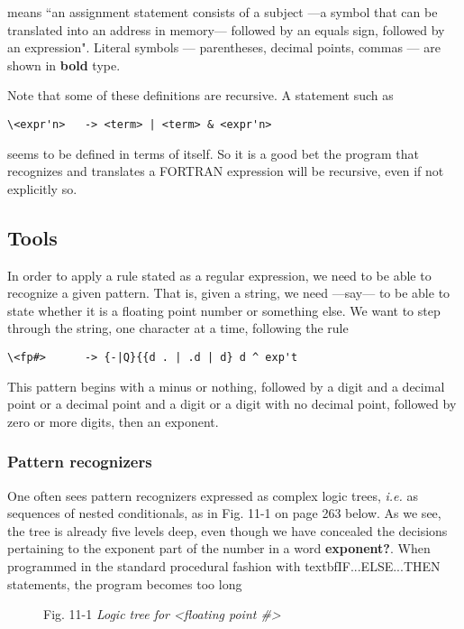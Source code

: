 \documentclass{book}
\begin{document}
means “an assignment statement consists of a subject ---a symbol that can be translated into an address in memory--- followed by an equals sign, followed by an expression". Literal symbols --- parentheses, decimal points, commas --- are shown in \textbf{bold} type.

Note that some of these definitions are recursive. A statement such as

\begin{lstlisting}
\<expr'n>   -> <term> | <term> & <expr'n>
\end{lstlisting}

seems to be defined in terms of itself. So it is a good bet the program that recognizes and translates a FORTRAN expression will be recursive, even if not explicitly so.

\subsection{Tools}

In order to apply a rule stated as a regular expression, we need to be able to recognize a given pattern. That is, given a string, we need —say— to be able to state whether it is a floating point number or something else. We want to step through the string, one character at a time, following the rule

\begin{lstlisting}
\<fp#>      -> {-|Q}{{d . | .d | d} d ^ exp't
\end{lstlisting}

This pattern begins with a minus or nothing, followed by a digit and a decimal point or a decimal point and a digit or a digit with no decimal point, followed by zero or more digits, then an exponent.

\subsubsection{Pattern recognizers}

One often sees pattern recognizers expressed as complex logic trees, \textit{i.e.} as sequences of nested conditionals, as in Fig. 11-1 on page 263 below. As we see, the tree is already five levels deep, even though we have concealed the decisions pertaining to the exponent part of the number in a word \textbf{exponent?}. When programmed in the standard procedural fashion with textbf{IF...ELSE...THEN} statements, the program becomes too long

\begin{figure}
    \caption{Fig. 11-1 \textit{Logic tree for <floating point \#>}}
\end{figure}
\end{document}
